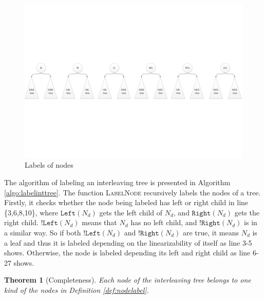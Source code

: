 \documentclass[runningheads]{llncs}
\newtheorem{myTheo}{Theorem}
\begin{document}
\begin{figure}[!ht]
\centering
\vspace{-0.5cm}
\includegraphics[width = 4.7in]{label.pdf}
\caption{Labels of nodes}\label{fig:labellabelnodes}
\end{figure}

The algorithm of labeling an interleaving tree is presented in Algorithm \ref{algo:labelinttree}. The function \textsc{LabelNode} recursively labels the nodes of a tree. Firstly, it checks whether the node being labeled has left or right child in line \{3,6,8,10\}, where $\mathtt{Left}(N_d)$ gets the left child of $N_d$, and $\mathtt{Right}(N_d)$ gets the right child. $!\mathtt{Left}(N_d)$ means that $N_d$ has no left child, and $!\mathtt{Right}(N_d)$ is in a similar way. So if both $!\mathtt{Left}(N_d)$ and $!\mathtt{Right}(N_d)$ are true, it means $N_d$ is a leaf and thus it is labeled depending on the linearizability of itself as line 3-5 shows. Otherwise, the node is labeled depending its left and right child as line 6-27 shows.



\begin{myTheo}[Completeness]
    Each node of the interleaving tree belongs to one kind of the nodes in Definition \ref{def:nodelabel}.
\end{myTheo}

\end{document}
